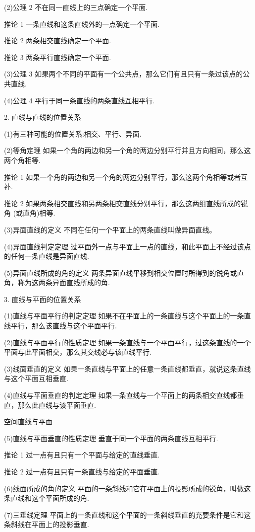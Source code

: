\documentclass[10pt]{article}
\begin{document}
(2)公理 2 不在同一直线上的三点确定一个平面.

推论 1 一条直线和这条直线外的一点确定一个平面.

推论 2 两条相交直线确定一个平面.

推论 3 两条平行直线确定一个平面.

(3)公理 3 如果两个不同的平面有一个公共点，那么它们有且只有一条过该点的公共直线.

(4)公理 4 平行于同一条直线的两条直线互相平行.

2. 直线与直线的位置关系

(1)有三种可能的位置关系:相交、平行、异面.

(2)等角定理 如果一个角的两边和另一个角的两边分别平行并且方向相同，那么这两个角相等.

推论 1 如果一个角的两边和另一个角的两边分别平行，那么这两个角相等或者互补.

推论 2 如果两条相交直线和另两条相交直线分别平行，那么这两组直线所成的锐角 (或直角)相等.

(3)异面直线的定义 不同在任何一个平面上的两条直线叫做异面直线。

(4)异面直线判定定理 过平面外一点与平面上一点的直线，和此平面上不经过该点的任何一条直线是异面直线.

(5)异面直线所成的角的定义 两条异面直线平移到相交位置时所得到的锐角或直角，称为这两条异面直线所成的角.

3. 直线与平面的位置关系

(1)直线与平面平行的判定定理 如果不在平面上的一条直线与这个平面上的一条直线平行，那么该直线与这个平面平行.

(2)直线与平面平行的性质定理 如果一条直线与一个平面平行，过这条直线的一个平面与此平面相交，那么其交线必与该直线平行.

(3)线面垂直的定义 如果一条直线与平面上的任意一条直线都垂直，就说这条直线与这个平面互相垂直.

(4)直线与平面垂直的判定定理 如果一条直线与一个平面上的两条相交直线都垂直，那么此直线与该平面垂直.



空间直线与平面

(5)直线与平面垂直的性质定理 垂直于同一个平面的两条直线互相平行.

推论 1 过一点有且只有一个平面与给定的直线垂直.

推论 2 过一点有且只有一条直线与给定的平面垂直.

(6)线面所成的角的定义 平面的一条斜线和它在平面上的投影所成的锐角，叫做这条直线和这个平面所成的角.

(7)三垂线定理 平面上的一条直线和这个平面的一条斜线垂直的充要条件是它和这条斜线在平面上的投影垂直.
\end{document}
